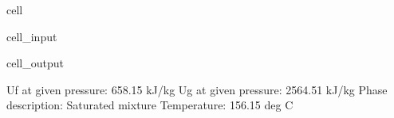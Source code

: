 \documentclass[letterpaper,10pt,english]{jupyterBook}
\begin{document}
\begin{sphinxuseclass}{cell}
\begin{sphinxVerbatimInput}
\begin{sphinxuseclass}{cell_input}
\end{sphinxuseclass}\end{sphinxVerbatimInput}
\begin{sphinxVerbatimOutput}

\begin{sphinxuseclass}{cell_output}
\begin{sphinxVerbatim}[commandchars=\\\{\}]
Uf at given pressure: 658.15 kJ/kg
Ug at given pressure: 2564.51 kJ/kg
Phase description: Saturated mixture
Temperature: 156.15 deg C
\end{sphinxVerbatim}

\end{sphinxuseclass}\end{sphinxVerbatimOutput}

\end{sphinxuseclass}
\end{document}

